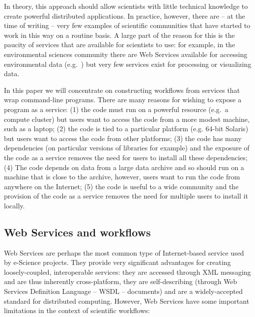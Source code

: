 \documentclass{llncs}
\begin{document}
In theory, this approach should allow scientists with little technical knowledge to create powerful distributed applications.  In practice, however, there are -- at the time of writing -- very few examples of scientific communities that have started to work in this way on a routine basis.  A large part of the reason for this is the paucity of services that are available for scientists to use: for example, in the environmental sciences community there are Web Services available for accessing environmental data (e.g.\ \cite{Woolf:2003}) but very few services exist for processing or visualizing data.

In this paper we will concentrate on constructing workflows from services that wrap command-line programs.  There are many reasons for wishing to expose a program as a service: (1) the code must run on a powerful resource (e.g.\ a compute cluster) but users want to access the code from a more modest machine, such as a laptop; (2) the code is tied to a particular platform (e.g. 64-bit Solaris) but users want to access the code from other platforms; (3) the code has many dependencies (on particular versions of libraries for example) and the exposure of the code as a service removes the need for users to install all these dependencies; (4) The code depends on data from a large data archive and so should run on a machine that is close to the archive,  however, users want to run the code from anywhere on the Internet; (5) the code is useful to a wide community and the provision of the code as a service removes the need for multiple users to install it locally.

\subsection{Web Services and workflows}\label{sec:webservices}
Web Services are perhaps the most common type of Internet-based service used by e-Science projects.  They provide very significant advantages for creating loosely-coupled, interoperable services: they are accessed through XML messaging and are thus inherently cross-platform, they are self-describing (through Web Services Definition Language -- WSDL -- documents) and are a widely-accepted standard for distributed computing.  However, Web Services have some important limitations in the context of scientific workflows:
\end{document}
